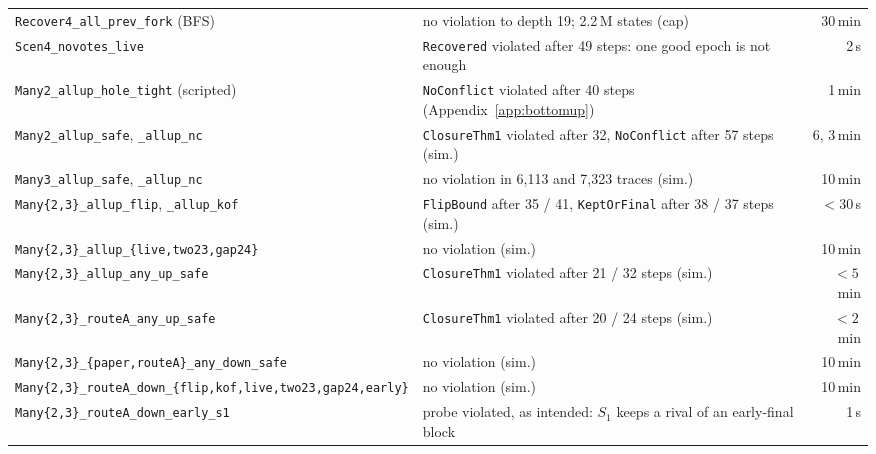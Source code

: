 \documentclass[conference]{IEEEtran}
\begin{document}
\begin{table}[t]
\begin{tabularx}{\textwidth}{@{}>{\raggedright\arraybackslash}p{}Yr@{}}
\texttt{Recover4\_\allowbreak{}all\_\allowbreak{}prev\_\allowbreak{}fork} (BFS) & no violation to depth 19; 2.2\,M states (cap) & 30\,min\\
\texttt{Scen4\_\allowbreak{}novotes\_\allowbreak{}live} & \texttt{Recovered} violated after 49 steps: one good epoch is not enough & 2\,s\\
\midrule
\texttt{Many2\_\allowbreak{}allup\_\allowbreak{}hole\_\allowbreak{}tight} (scripted) & \texttt{NoConflict} violated after 40 steps (Appendix~\ref{app:bottomup}) & 1\,min\\
\texttt{Many2\_\allowbreak{}allup\_\allowbreak{}safe},\allowbreak{} \texttt{\_\allowbreak{}allup\_\allowbreak{}nc} & \texttt{ClosureThm1} violated after 32, \texttt{NoConflict} after 57 steps (sim.) & 6, 3\,min\\
\texttt{Many3\_\allowbreak{}allup\_\allowbreak{}safe},\allowbreak{} \texttt{\_\allowbreak{}allup\_\allowbreak{}nc} & no violation in 6{,}113 and 7{,}323 traces (sim.) & 10\,min\\
\texttt{Many\{2,\allowbreak{}3\}\_\allowbreak{}allup\_\allowbreak{}flip},\allowbreak{} \texttt{\_\allowbreak{}allup\_\allowbreak{}kof} & \texttt{FlipBound} after 35 / 41, \texttt{KeptOrFinal} after 38 / 37 steps (sim.) & $<30$\,s\\
\texttt{Many\{2,\allowbreak{}3\}\_\allowbreak{}allup\_\allowbreak{}\{live,\allowbreak{}two23,\allowbreak{}gap24\}} & no violation (sim.) & 10\,min\\
\texttt{Many\{2,\allowbreak{}3\}\_\allowbreak{}allup\_\allowbreak{}any\_\allowbreak{}up\_\allowbreak{}safe} & \texttt{ClosureThm1} violated after 21 / 32 steps (sim.) & $<5$\,min\\
\texttt{Many\{2,\allowbreak{}3\}\_\allowbreak{}routeA\_\allowbreak{}any\_\allowbreak{}up\_\allowbreak{}safe} & \texttt{ClosureThm1} violated after 20 / 24 steps (sim.) & $<2$\,min\\
\texttt{Many\{2,\allowbreak{}3\}\_\allowbreak{}\{paper,\allowbreak{}routeA\}\_\allowbreak{}any\_\allowbreak{}down\_\allowbreak{}safe} & no violation (sim.) & 10\,min\\
\texttt{Many\{2,\allowbreak{}3\}\_\allowbreak{}routeA\_\allowbreak{}down\_\allowbreak{}\{flip,\allowbreak{}kof,\allowbreak{}live,\allowbreak{}two23,\allowbreak{}gap24,\allowbreak{}early\}} & no violation (sim.) & 10\,min\\
\texttt{Many\{2,\allowbreak{}3\}\_\allowbreak{}routeA\_\allowbreak{}down\_\allowbreak{}early\_\allowbreak{}s1} & probe violated, as intended: $S_1$ keeps a rival of an early-final block & 1\,s\\

\end{tabularx}
\end{table}
\end{document}
